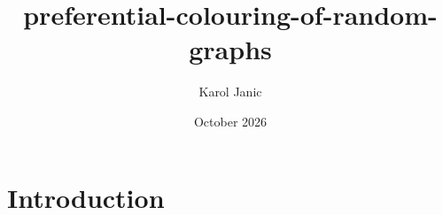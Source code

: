 \documentclass{article}
\title{preferential-colouring-of-random-graphs}
\author{Karol Janic}
\date{October 2026}
\begin{document}
\maketitle

\section{Introduction}
\end{document}
